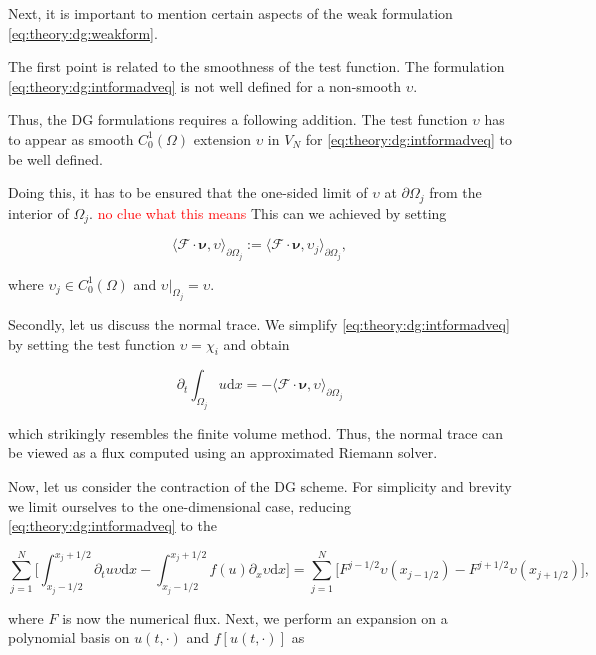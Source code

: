 Next, it is important to mention certain aspects of the weak formulation \ref{eq:theory:dg:weakform}. 

The first point is related to the smoothness of the test function. The formulation \ref{eq:theory:dg:intformadveq} is not well defined for a non-smooth $\upsilon$. 

Thus, the DG formulations requires a following addition. The test function $\upsilon$ has to appear as smooth $C_0 ^1(\Omega)$ extension $\upsilon$ in $V_N$ for \ref{eq:theory:dg:intformadveq} to be well defined. 

Doing this, it has to be ensured that the one-sided limit of $\upsilon$ at $\partial\Omega_j$ from the interior of $\Omega_j$. \textcolor{red}{no clue what this means} 
This can we achieved by setting

\begin{equation}
\langle\boldsymbol{\mathcal{F}}\cdot\boldsymbol{\nu},\upsilon\rangle_{\partial\Omega_j} := \langle\boldsymbol{\mathcal{F}}\cdot\boldsymbol{\nu},\upsilon_j\rangle_{\partial\Omega_j},
\end{equation}

where $\upsilon_j \in C_0 ^1 (\Omega)$ and $\upsilon|_{\Omega_j}=\upsilon$. 

Secondly, let us discuss the normal trace. We simplify \ref{eq:theory:dg:intformadveq} by setting the test function $\upsilon = \chi_i$ and obtain

\begin{equation}
\partial_t\int_{\Omega_j}u\text{d}x = - \langle\boldsymbol{\mathcal{F}}\cdot\boldsymbol{\nu},\upsilon\rangle_{\partial\Omega_j}
\end{equation}

which strikingly resembles the finite volume method. 
Thus, the normal trace can be viewed as a flux computed using an approximated Riemann solver. 


Now, let us consider the contraction of the DG scheme. For simplicity and brevity we limit ourselves to the one-dimensional case, reducing \ref{eq:theory:dg:intformadveq} to the 

\begin{equation}
\sum_{j=1}^{N}\Bigg[\int_{x_j - 1/2}^{x_j +1/2}\partial_t u \upsilon \text{d}x - \int_{x_j - 1/2}^{x_j +1/2}f(u)\partial_x\upsilon\text{d}x\Bigg] = \sum_{j=1}^{N}\big[F^{j-1/2}\upsilon(x_{j-1/2}) - F^{j+1/2}\upsilon(x_{j+1/2})\big],
\end{equation}

where $F$ is now the numerical flux. 
Next, we perform an expansion on a polynomial basis on $u(t,\cdot)$ and $f[u(t,\cdot)]$ as

